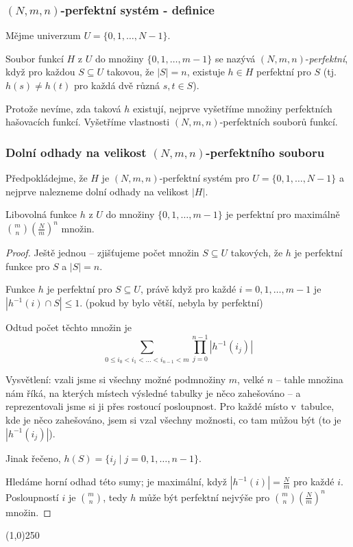 \documentclass[a4paper,12pt]{article}
\newenvironment{myproof}{
  \begin{proof}
    
  }{
  \end{proof}
  \begin{center}
   \line(1,0){250}
   \end{center}
  }
\begin{document}
\subsubsection{$(N,m,n)$-perfektní systém - definice}

Mějme univerzum $U=\{0,1,\dots,N-1\}$. 

\begin{definice}Soubor funkcí $H$ z 
$U$ do množiny $\{0,1,\dots,m-1\}$ se nazývá 
$(N,m,n)$-\emph{perfektní}, když pro každou $S\subseteq 
U$ 
takovou, že $|S|=n$, existuje $h\in H$ perfektní pro $S$ (tj. 
$h(s)\ne h(t)$ pro každá dvě různá $s,t\in S$).
\end{definice}

Protože nevíme, zda taková $h$ existují, nejprve 
vyšetříme mno\-ži\-ny perfektních hašovacích 
funkcí. Vyšetříme vlastnosti $(N,m,n)$-perfektních 
souborů funkcí.

\subsubsection{Dolní odhady na velikost $(N,m,n)$-perfektního souboru}

Předpokládejme, že $H$ je $(N,m,n)$-perfektní 
systém pro $U=\{0,1,\dots,N-1\}$ a nejprve nalezneme dolní 
odhady na velikost $|H|$.

\begin{lemma}
    Libovolná funkce $h$ z $U$ do množiny $\{0,1,\dots,m-
    1\}$ je perfektní pro maximálně $\binom 
    mn(\frac Nm)^n$ množin.
\end{lemma}
\begin{myproof}
    Ještě jednou -- zjišťujeme počet množin $S\subseteq U$ takových, že  
    $h$ je perfektní funkce pro $S$ a $|S|=n$.
    
    Funkce $h$ je perfektní pro 
    $S\subseteq U$, právě když pro každé $i=0,1,\dots,m-
    1$ je 
    $|h^{-1}(i)\cap S|\le 1$. (pokud by bylo větší, nebyla by perfektní)
    
    Odtud počet těchto množin je
    $$\sum_{0\le i_0<i_1<\dots<i_{
    n-1}<m} \prod_{j=0}^{n-1}|h^{-1}(i_j)|$$
    
    Vysvětlení: vzali jsme si všechny možné podmnožiny $m$, velké $n$ -- tahle množina nám říká, na kterých místech výsledné tabulky je něco zahešováno -- a reprezentovali jsme si ji přes rostoucí posloupnost. Pro každé místo v~tabulce, kde je něco zahešováno, jsem si vzal všechny možnosti, co tam můžou být (to je $|h^{-1}(i_j)|$).
    
    Jinak řečeno, $h(S)=\{i_j\mid j=0,1,\dots,n-1\}$.
    
    Hledáme horní odhad této sumy; je maximální, když $|h^{-1}(
    i)|=\frac Nm$ pro každé $i$. Posloupností $i$ je $\binom mn$, tedy $h$ může být perfektní nejvýše pro $\binom 
    mn(\frac Nm)^n$ 
    množin.
\end{myproof}
    
\end{document}
